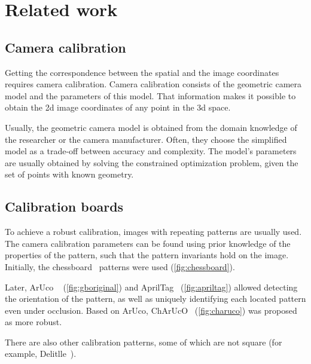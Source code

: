 \chapter{Related work}\label{cha:related_work}

\section{Camera calibration}\label{sub:camera_calibration}

Getting the correspondence between the spatial
and the image coordinates requires camera calibration. Camera
calibration consists of the geometric camera model and the parameters of this
model. That information makes it possible to obtain the 2d image coordinates
of any point in the 3d space.

Usually, the geometric camera model is obtained from the domain knowledge of the
researcher or the camera manufacturer. Often, they choose the simplified model as
a trade-off between accuracy and complexity. The model's parameters are usually
obtained by solving the constrained optimization problem, given the set of
points with known geometry.

\section{Calibration boards}\label{sub:calibration_boards}

To achieve a robust calibration, images with repeating patterns are
usually used. The camera
calibration parameters can be found using prior knowledge of the properties of
the pattern, such that the pattern invariants hold on
the image. Initially, the chessboard~\citep{OpenCVCameraCalibration,
	v.douskosAutomaticCalibrationDigital2007} patterns were used
(\cref{fig:chessboard}).

Later, ArUco
~\citep{garrido-juradoAutomaticGenerationDetection2014} (\cref{fig:gboriginal}) and
AprilTag~\citep{olsonAprilTagRobustFlexible2011} (\cref{fig:apriltag})
allowed detecting the
orientation of the pattern, as well as uniquely identifying each located pattern
even under occlusion. Based on ArUco,
ChArUcO~\citep{OpenCVCameraCalibration} (\cref{fig:charuco}) was
proposed as more robust.

There are also other calibration patterns, some of which are not square (for
example, Delitlle~\citep{haDeltilleGridsGeometric2017}).

